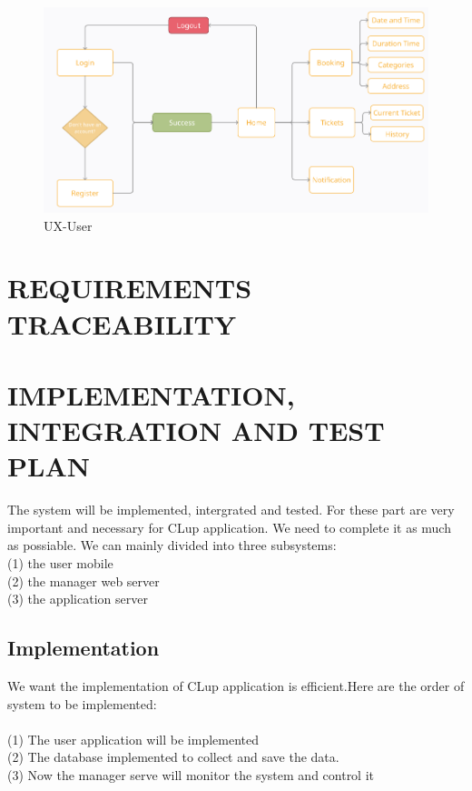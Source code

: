 \documentclass[a4paper,12pt]{report}
\begin{document}
\begin{figure}[H]
	\centering
	\includegraphics[scale=0.5]{UX-User.png}
	\caption{UX-User}
	\centering
	\label{UX-User}
\end{figure}



\chapter{REQUIREMENTS TRACEABILITY}\label{ch:requirements-traceability}


\chapter{IMPLEMENTATION, INTEGRATION AND TEST PLAN}\label{ch:implementation-integration-and-test-plan}

The system will be implemented, intergrated and tested. For these part are very important and necessary for CLup application. We need to complete it as much as possiable. We can mainly divided into three subsystems: ~\\
(1) the user mobile~\\
(2) the manager web server ~\\
(3) the application server~\\

\section{Implementation }
We want the implementation of CLup application is efficient.Here are the order of system to be implemented:~\\
~\\
(1) The user application will be implemented ~\\
(2) The database implemented to collect and save the data.~\\
(3) Now the manager serve will monitor the system and control it~\\
\end{document}
